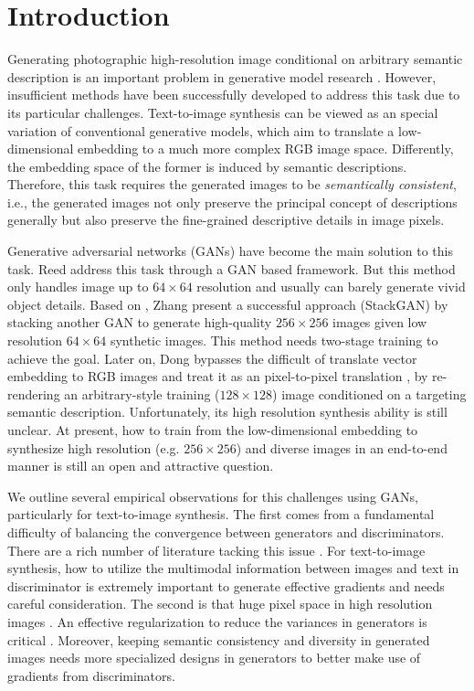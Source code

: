 \documentclass[10pt,twocolumn,letterpaper]{article}
\begin{document}
\section{Introduction}
Generating photographic high-resolution image conditional on arbitrary semantic description is an important problem in generative model research \cite{reed2016generative}. However, insufficient methods have been successfully developed to address this task due to its particular challenges. Text-to-image synthesis can be viewed as an special variation of conventional generative models, which aim to translate a low-dimensional embedding  to a much more complex RGB image space.  Differently, the embedding space of the former is induced by semantic descriptions. Therefore, this task requires the generated images to be \textit{semantically consistent}, i.e., the generated images not only preserve the principal concept of descriptions generally but also preserve the fine-grained descriptive details in image pixels. 

Generative adversarial networks (GANs) have become the main solution to this task. 
Reed \etal \cite{reed2016generative} address this task through a GAN based framework. But this method only handles image up to $64{\times}64$ resolution and usually can barely generate vivid object details.
Based on \cite{reed2016generative}, Zhang \etal \cite{han2017stackgan} present a successful approach (StackGAN) by stacking another GAN to generate high-quality $256{\times}256$ images given low resolution $64{\times}64$ synthetic images. This method needs two-stage training to achieve the goal. Later on, Dong \etal \cite{dong2017semantic} 
bypasses the difficult of translate vector embedding to RGB images and treat it as an pixel-to-pixel translation \cite{isola2016image}, by re-rendering an arbitrary-style training ($128{\times}128$) image conditioned on a targeting semantic description. Unfortunately, its high resolution synthesis ability is still unclear. 
At present, how to train from the low-dimensional embedding to synthesize high resolution (e.g. $256{\times}256$) and diverse images in an end-to-end manner is still an open and attractive question. 

We outline several empirical observations for this challenges using GANs, particularly for text-to-image synthesis. The first comes from a fundamental difficulty of balancing the convergence between generators and discriminators. There are a rich number of literature tacking this issue \cite{salimans2016improved,huang2016stacked}. For text-to-image synthesis, how to utilize the multimodal information between images and text in discriminator is extremely important to generate effective gradients and needs careful consideration. The second is that huge pixel space in high resolution images \cite{han2017stackgan}. 
An effective regularization to reduce the variances in generators is critical \cite{huang2016stacked}. 
Moreover, keeping semantic consistency and diversity in generated images needs more specialized designs in generators to better make use of gradients from discriminators. 
\end{document}
